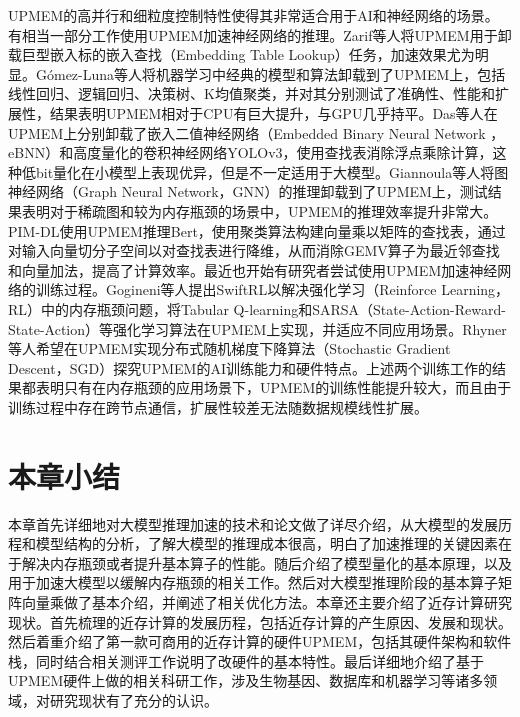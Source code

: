 UPMEM的高并行和细粒度控制特性使得其非常适合用于AI和神经网络的场景。有相当一部分工作使用UPMEM加速神经网络的推理。Zarif等人\cite{UPMEMEmbeddingLookups}将UPMEM用于卸载巨型嵌入标的嵌入查找（Embedding Table Lookup）任务，加速效果尤为明显。Gómez-Luna等人\cite{UPMEMTraditionalML}将机器学习中经典的模型和算法卸载到了UPMEM上，包括线性回归、逻辑回归、决策树、K均值聚类，并对其分别测试了准确性、性能和扩展性，结果表明UPMEM相对于CPU有巨大提升，与GPU几乎持平。Das等人\cite{UPMEMCNN}在UPMEM上分别卸载了嵌入二值神经网络（Embedded Binary Neural Network ，eBNN）和高度量化的卷积神经网络YOLOv3，使用查找表消除浮点乘除计算，这种低bit量化在小模型上表现优异，但是不一定适用于大模型。Giannoula等人\cite{UPMEMGNN}将图神经网络（Graph Neural Network，GNN）的推理卸载到了UPMEM上，测试结果表明对于稀疏图和较为内存瓶颈的场景中，UPMEM的推理效率提升非常大。PIM-DL\cite{PIM-DL}使用UPMEM推理Bert，使用聚类算法构建向量乘以矩阵的查找表，通过对输入向量切分子空间以对查找表进行降维，从而消除GEMV算子为最近邻查找和向量加法，提高了计算效率。最近也开始有研究者尝试使用UPMEM加速神经网络的训练过程。Gogineni等人\cite{SwiftRL}提出SwiftRL以解决强化学习（Reinforce Learning，RL）中的内存瓶颈问题，将Tabular Q-learning和SARSA（State-Action-Reward-State-Action）等强化学习算法在UPMEM上实现，并适应不同应用场景。Rhyner等人\cite{PIM-Opt}希望在UPMEM实现分布式随机梯度下降算法（Stochastic Gradient Descent，SGD）探究UPMEM的AI训练能力和硬件特点。上述两个训练工作的结果都表明只有在内存瓶颈的应用场景下，UPMEM的训练性能提升较大，而且由于训练过程中存在跨节点通信，扩展性较差无法随数据规模线性扩展。

\section{本章小结}
本章首先详细地对大模型推理加速的技术和论文做了详尽介绍，从大模型的发展历程和模型结构的分析，了解大模型的推理成本很高，明白了加速推理的关键因素在于解决内存瓶颈或者提升基本算子的性能。随后介绍了模型量化的基本原理，以及用于加速大模型以缓解内存瓶颈的相关工作。然后对大模型推理阶段的基本算子矩阵向量乘做了基本介绍，并阐述了相关优化方法。本章还主要介绍了近存计算研究现状。首先梳理的近存计算的发展历程，包括近存计算的产生原因、发展和现状。然后着重介绍了第一款可商用的近存计算的硬件UPMEM，包括其硬件架构和软件栈，同时结合相关测评工作说明了改硬件的基本特性。最后详细地介绍了基于UPMEM硬件上做的相关科研工作，涉及生物基因、数据库和机器学习等诸多领域，对研究现状有了充分的认识。